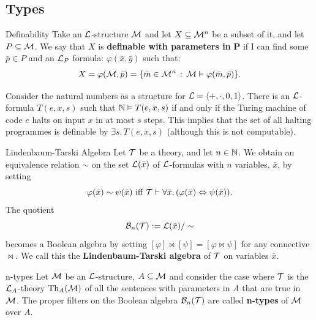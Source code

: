 \documentclass{article}
\numberwithin{thm}{subsection}
\begin{document}
\subsection{Types}
\begin{fancydefine}{Definability}
    Take an $\mathcal{L}$-structure $\mathcal{M}$ and let $X \subseteq \mathcal{M}^{n}$ be a subset of it, and let $P \subseteq \mathcal{M}$. We say that $X$ is \textbf{definable with parameters in }$\mathbf{P}$ if I can find some $\bar p \in P$ and an $\mathcal{L}_{P}$ formula: $\varphi(\bar x, \bar y)$ such that:\[
        X = \varphi(\mathcal{M}, \bar p) = \{ \bar m \in \mathcal{M}^{n} \, : \, \mathcal{M} \vDash \varphi(\bar m, \bar p)\}.\]
\end{fancydefine}
\begin{ex}{}
    Consider the natural numbers as a structure for $\mathcal{L} = \langle +, \cdot, 0, 1 \rangle$. There is an $\mathcal{L}$-formula $T(e,x,s)$ such that $\mathbb{N} \vDash T(e,x,s)$ if and only if the Turing machine of code $e$ halts on input $x$ in at most $s$ steps. This implies that the set of all halting programmes is definable by $\exists s. \, T(e,x,s)$ (although this is not computable).
\end{ex}
\begin{fancydefine}{Lindenbaum-Tarski Algebra}
    Let $\mathcal{T}$ be a theory, and let $n \in \mathbb{N}$. We obtain an equivalence relation $\sim$ on the set $\mathcal{L}(\bar x)$ of $\mathcal{L}$-formulas with $n$ variables, $\bar x$, by setting \[ \varphi(\bar x) \sim \psi(\bar x) \, \, \text{iff}\,\, \mathcal{T} \vdash \forall \bar x. \, (\varphi(\bar x) \Leftrightarrow \psi( \bar x)).\]
    The quotient \[ \mathcal{B}_{n}(\mathcal{T}) := \mathcal{L}(\bar x) / \sim \] becomes a Boolean algebra by setting $[\varphi] \bowtie [\psi] = [\varphi \bowtie \psi]$ for any connective $\bowtie$. We call this the \textbf{Lindenbaum-Tarski algebra} of $\mathcal{T}$ on variables $\bar x$.
\end{fancydefine}
\newpage
\begin{fancydefine*}{n-types}
    Let $\mathcal{M}$ be an $\mathcal{L}$-structure, $A \subseteq \mathcal{M}$ and consider the case where $\mathcal{T}$ is the $\mathcal{L}_{A}$-theory $\operatorname{Th}_{A}(\mathcal{M})$ of all the sentences with parameters in $A$ that are true in $\mathcal{M}$. The proper filters on the Boolean algebra $\mathcal{B}_{n}(\mathcal{T})$ are called \textbf{n-types} of $\mathcal{M}$ over $A$.
\end{fancydefine*}
\end{document}
